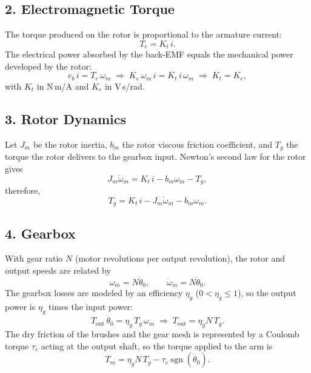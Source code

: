 \documentclass[a4paper,11pt]{article}
\newcommand{\sgn}{\operatorname{sgn}}
\begin{document}
\subsection{2. Electromagnetic Torque}
The torque produced on the rotor is proportional to the armature current:
\begin{equation}
  T_e = K_t\, i .
\end{equation}
The electrical power absorbed by the back-EMF equals the mechanical power developed by the rotor:
\begin{equation}
  e_b\, i = T_e\, \omega_m \;\Rightarrow\; K_e\, \omega_m\, i = K_t\, i\, \omega_m \;\Rightarrow\; K_t = K_e ,
  \label{eq:KtKe}
\end{equation}
with $K_t$ in N\,m/A and $K_e$ in V\,s/rad.

\subsection{3. Rotor Dynamics}
Let $J_m$ be the rotor inertia, $b_m$ the rotor viscous friction coefficient, and $T_g$ the torque the rotor delivers to the gearbox input. Newton's second law for the rotor gives
\begin{equation}
  J_m \dot\omega_m = K_t\, i - b_m \omega_m - T_g ,
\end{equation}
therefore,
\begin{equation}
  T_g = K_t\, i - J_m \dot\omega_m - b_m \omega_m .
  \label{eq:rotor}
\end{equation}

\subsection{4. Gearbox}
With gear ratio $N$ (motor revolutions per output revolution), the rotor and output speeds are related by
\begin{equation}
  \omega_m = N \dot\theta_0, \qquad \dot\omega_m = N \ddot\theta_0 .
  \label{eq:gear}
\end{equation}
The gearbox losses are modeled by an efficiency $\eta_g$ ($0 < \eta_g \le 1$), so the output power is $\eta_g$ times the input power:
\begin{equation}
  T_{\mathrm{out}}\, \dot\theta_0 = \eta_g\, T_g\, \omega_m \;\Rightarrow\; T_{\mathrm{out}} = \eta_g N\, T_g .
\end{equation}
The dry friction of the brushes and the gear mesh is represented by a Coulomb torque $\tau_c$ acting at the output shaft, so the torque applied to the arm is
\begin{equation}
  T_m = \eta_g N\, T_g - \tau_c \sgn(\dot\theta_0) .
  \label{eq:Tout}
\end{equation}
\end{document}
